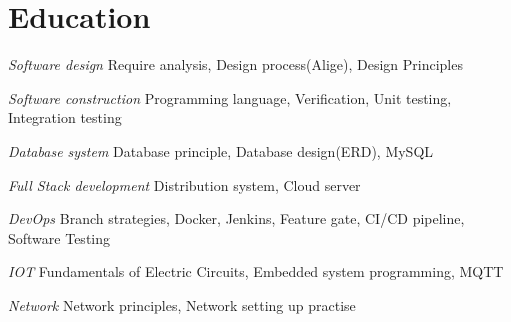 \section{Education}
\begin{resume_list}
	\item {\it Software design} {\hfill Require analysis, Design process(Alige), Design Principles}
	\item {\it Software construction}  {\hfill Programming language, Verification, Unit testing, Integration testing}
	\item {\it Database system} {\hfill Database principle, Database design(ERD), MySQL}
	\item {\it Full Stack development} {\hfill Distribution system, Cloud server}
	\item {\it DevOps} {\hfill Branch strategies, Docker, Jenkins, Feature gate, CI/CD pipeline, Software Testing}
	\item {\it IOT} {\hfill Fundamentals of Electric Circuits, Embedded system programming, MQTT}
	\item {\it Network} {\hfill Network principles, Network setting up practise}
\end{resume_list}
